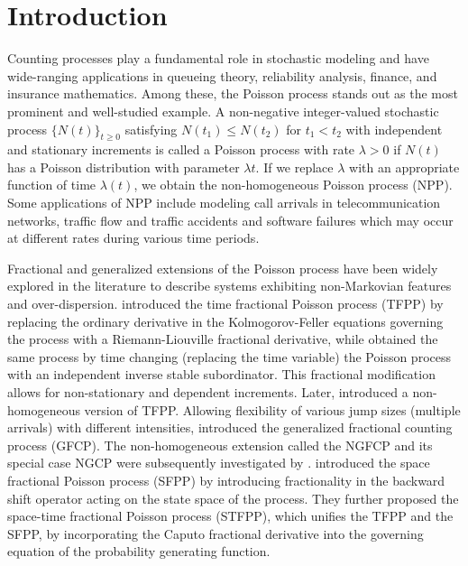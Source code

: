 \documentclass[11pt,oneside,reqno]{amsart}
\theoremstyle{definition}
\theoremstyle{remarkstyle}
\begin{document}
\maketitle


\section{Introduction}
Counting processes play a fundamental role in stochastic modeling and have wide-ranging applications in queueing theory, reliability analysis, finance, and insurance mathematics. Among these, the Poisson process stands out as the most prominent and well-studied example. A non-negative integer-valued stochastic process $\{N(t)\}_{t\geq 0}$ satisfying $N(t_1) \leq N(t_2)$ for $t_1 < t_2$ with independent and stationary increments is called a Poisson process with rate $\lambda>0$ if $N(t)$ has a Poisson distribution with parameter $\lambda t$. If we replace $\lambda$ with an appropriate function of time $\lambda(t)$, we obtain the non-homogeneous Poisson process (NPP). Some applications of NPP include modeling call arrivals in telecommunication networks, traffic flow and traffic accidents and software failures which may occur at different rates during various time periods. 

Fractional and generalized extensions of the Poisson process have been widely explored in the literature to describe systems exhibiting non-Markovian features and over-dispersion. \citet{LASKIN2003201} introduced the time fractional Poisson process (TFPP) by replacing the ordinary derivative in the Kolmogorov-Feller equations governing the process with a Riemann-Liouville fractional derivative, while \citet{Meerschaert2011} obtained the same process by time changing (replacing the time variable) the Poisson process with an independent inverse stable subordinator. This fractional modification allows for non-stationary and dependent increments. Later, \citet{Leonenko2017} introduced a non-homogeneous version of TFPP. Allowing flexibility of various jump sizes (multiple arrivals) with different intensities, \citet{Crescenzo2016} introduced the generalized fractional counting process (GFCP). The non-homogeneous extension called the NGFCP and its special case NGCP were subsequently investigated by \citet{Kataria2025}. \citet{Orsingher2012} introduced the space fractional Poisson process (SFPP) by introducing fractionality in the backward shift operator acting on the state space of the process. They further proposed the space-time fractional Poisson process (STFPP), which unifies the TFPP and the SFPP, by incorporating the Caputo fractional derivative into the governing equation of the probability generating function.
\end{document}
